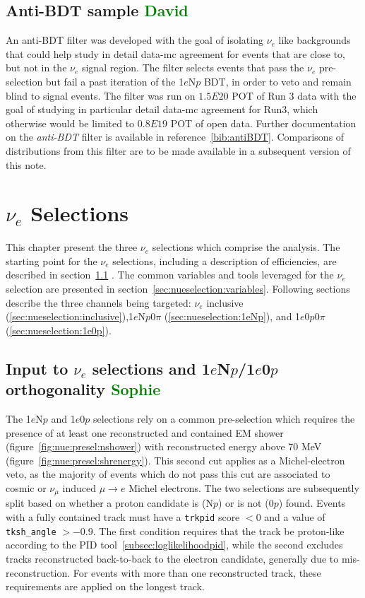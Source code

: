 \documentclass[a4paper]{article}
\begin{document}
\subsection{Anti-BDT sample \textcolor{green}{David}}
\par An anti-BDT filter was developed with the goal of isolating $\nu_e$ like backgrounds that could help study in detail data-mc agreement for events that are close to, but not in the $\nu_e$ signal region. The filter selects events that pass the $\nu_e$  pre-selection but fail a past iteration of the 1$e$N$p$ BDT, in order to veto and remain blind to signal events. The filter was run on $1.5E20$ POT of Run 3 data with the goal of studying in particular detail data-mc agreement for Run3, which otherwise would be limited to $0.8E19$ POT of open data. Further documentation on the \emph{anti-BDT} filter is available in reference~\ref{bib:antiBDT}. Comparisons of distributions from this filter are to be made available in a subsequent version of this note.

\newpage

\section{$\nu_e$ Selections}
\par This chapter present the three $\nu_e$ selections which comprise the analysis. The starting point for the $\nu_e$ selections, including a description of efficiencies, are described in section~\ref{sec:nueselection:inputs} . The common variables and tools leveraged for the $\nu_e$ selection are presented in section~\ref{sec:nueselection:variables}. Following sections describe the three channels being targeted: $\nu_e$ inclusive (\ref{sec:nueselection:inclusive}),1$e$N$p$0$\pi$ (\ref{sec:nueselection:1eNp}), and 1$e$0$p$0$\pi$ (\ref{sec:nueselection:1e0p}).

\subsection{Input to $\nu_e$ selections and 1$e$N$p$/1$e$0$p$ orthogonality \textcolor{green}{Sophie}}
\label{sec:nueselection:inputs}

The 1$e$N$p$ and 1$e$0$p$ selections rely on a common pre-selection which requires the presence of at least one reconstructed and contained EM shower (figure~\ref{fig:nue:presel:nshower}) with reconstructed energy above 70 MeV (figure~\ref{fig:nue:presel:shrenergy}). This second cut applies as a Michel-electron veto, as the majority of events which do not pass this cut are associated to cosmic or $\nu_{\mu}$ induced $\mu \rightarrow e$ Michel electrons. The two selections are subsequently split based on whether a proton candidate is (N$p$) or is not (0$p$) found. Events with a fully contained track must have a \texttt{trkpid} score $< 0$ and a value of \texttt{tksh\_angle} $> -0.9$. The first condition requires that the track be proton-like according to the PID tool~\ref{subsec:loglikelihoodpid}, while the second excludes tracks reconstructed back-to-back to the electron candidate, generally due to mis-reconstruction. For events with more than one reconstructed track, these requirements are applied on the longest track.
\end{document}
